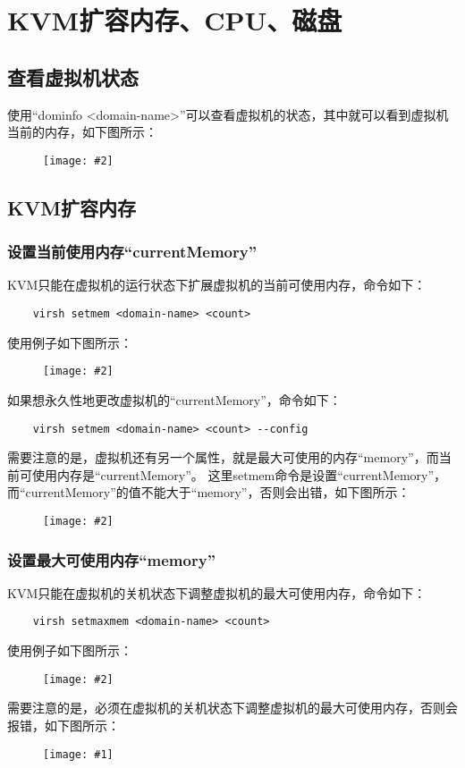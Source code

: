 \documentclass[a4paper,left=2.5cm,right=2.5cm,11pt]{article}
\newcommand{\fic}[1]{\begin{figure}[H]
		\center
		\texttt{[image: \#1]}
	\end{figure}}
\newcommand{\sizedfic}[2]{\begin{figure}[H]
		\center
		\texttt{[image: \#2]}
	\end{figure}}
\begin{document}
\tableofcontents

\clearpage

\section{KVM扩容内存、CPU、磁盘}
\subsection{查看虚拟机状态}
	使用“dominfo <domain-name>”可以查看虚拟机的状态，其中就可以看到虚拟机当前的内存，如下图所示：
	\sizedfic{0.5}{1.png}

\subsection{KVM扩容内存}
\subsubsection{设置当前使用内存“currentMemory”}
	KVM只能在虚拟机的运行状态下扩展虚拟机的当前可使用内存，命令如下：
	\begin{lstlisting}
	virsh setmem <domain-name> <count>
	\end{lstlisting}

	使用例子如下图所示：
	\sizedfic{0.6}{2.png}

	如果想永久性地更改虚拟机的“currentMemory”，命令如下：
	\begin{lstlisting}
	virsh setmem <domain-name> <count> --config
	\end{lstlisting}

	需要注意的是，虚拟机还有另一个属性，就是最大可使用的内存“memory”，而当前可使用内存是“currentMemory”。
	这里setmem命令是设置“currentMemory”，而“currentMemory”的值不能大于“memory”，否则会出错，如下图所示：
	\sizedfic{0.5}{3.png}

\subsubsection{设置最大可使用内存“memory”}
	KVM只能在虚拟机的关机状态下调整虚拟机的最大可使用内存，命令如下：
	\begin{lstlisting}
	virsh setmaxmem <domain-name> <count>
	\end{lstlisting}

	使用例子如下图所示：
	\sizedfic{0.6}{4.png}

	需要注意的是，必须在虚拟机的关机状态下调整虚拟机的最大可使用内存，否则会报错，如下图所示：
	\fic{5.png}
\end{document}
